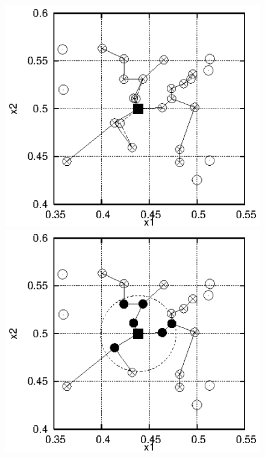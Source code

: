 \documentclass{vki_ls}
\begin{document}
\begin{figure}[h!]
    \centering
    \begin{minipage}{0.49\linewidth}
        \includegraphics[scale=1.0]{stp_goodrbf_st1.eps}
        \vspace{0.3cm}
    \end{minipage}
    \begin{minipage}{0.49\linewidth}
        \includegraphics[scale=1.0]{stp_goodrbf_st2.eps}
        \vspace{0.3cm}
    \end{minipage}

\end{figure}
\end{document}

